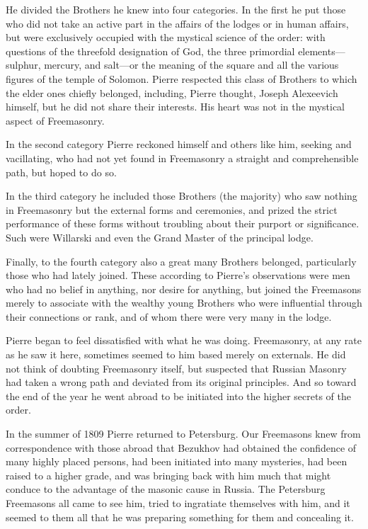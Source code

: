 He divided the Brothers he knew into four categories. In the
first he put those who did not take an active part in the affairs
of the lodges or in human affairs, but were exclusively occupied
with the mystical science of the order: with questions of the
threefold designation of God, the three primordial
elements---sulphur, mercury, and salt---or the meaning of the
square and all the various figures of the temple of
Solomon. Pierre respected this class of Brothers to which the
elder ones chiefly belonged, including, Pierre thought, Joseph
Alexeevich himself, but he did not share their interests. His
heart was not in the mystical aspect of Freemasonry.

In the second category Pierre reckoned himself and others like
him, seeking and vacillating, who had not yet found in
Freemasonry a straight and comprehensible path, but hoped to do
so.

In the third category he included those Brothers (the majority)
who saw nothing in Freemasonry but the external forms and
ceremonies, and prized the strict performance of these forms
without troubling about their purport or significance. Such were
Willarski and even the Grand Master of the principal lodge.

Finally, to the fourth category also a great many Brothers
belonged, particularly those who had lately joined. These
according to Pierre's observations were men who had no belief in
anything, nor desire for anything, but joined the Freemasons
merely to associate with the wealthy young Brothers who were
influential through their connections or rank, and of whom there
were very many in the lodge.

Pierre began to feel dissatisfied with what he was
doing. Freemasonry, at any rate as he saw it here, sometimes
seemed to him based merely on externals. He did not think of
doubting Freemasonry itself, but suspected that Russian Masonry
had taken a wrong path and deviated from its original
principles. And so toward the end of the year he went abroad to
be initiated into the higher secrets of the order.

In the summer of 1809 Pierre returned to Petersburg. Our
Freemasons knew from correspondence with those abroad that
Bezukhov had obtained the confidence of many highly placed
persons, had been initiated into many mysteries, had been raised
to a higher grade, and was bringing back with him much that might
conduce to the advantage of the masonic cause in Russia. The
Petersburg Freemasons all came to see him, tried to ingratiate
themselves with him, and it seemed to them all that he was
preparing something for them and concealing it.

